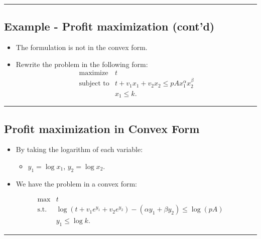 \documentclass[
]{article}
\providecommand{\tightlist}{%
  \setlength{\itemsep}{0pt}\setlength{\parskip}{0pt}}
\begin{document}
\begin{center}\rule{0.5\linewidth}{0.5pt}\end{center}

\subsection{Example - Profit maximization
(cont'd)}\label{example---profit-maximization-contd}

\begin{itemize}
\tightlist
\item
  The formulation is not in the convex form.
\item
  Rewrite the problem in the following form: \[\begin{array}{ll}
    \text{maximize} & t \\
    \text{subject to} & t  + v_1 x_1  + v_2 x_2 \le p A x_1^{\alpha} x_2^{\beta}\\
                  & x_1 \le k.
    \end{array}\]
\end{itemize}

\begin{center}\rule{0.5\linewidth}{0.5pt}\end{center}

\subsection{Profit maximization in Convex
Form}\label{profit-maximization-in-convex-form}

\begin{itemize}
\item
  By taking the logarithm of each variable:

  \begin{itemize}
  \tightlist
  \item
    \(y_1 = \log x_1\), \(y_2 = \log x_2\).
  \end{itemize}
\item
  We have the problem in a convex form:
\end{itemize}

\[\begin{array}{ll}
    \text{max}  & t \\
    \text{s.t.} & \log(t + v_1 e^{y_1} + v_2 e^{y_2}) - (\alpha y_1 + \beta y_2) \le \log(pA) \\
                & y_1 \le \log k.
\end{array}\]

\begin{center}\rule{0.5\linewidth}{0.5pt}\end{center}
\end{document}
